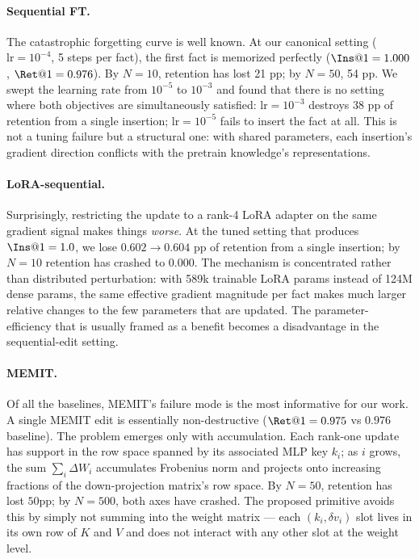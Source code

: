 \documentclass[11pt,a4paper]{article}
\begin{document}
\paragraph{Sequential FT.} The catastrophic forgetting curve is well
known. At our canonical setting ($\text{lr} = 10^{-4}$, 5 steps per
fact), the first fact is memorized perfectly ($\Ins@1 = 1.000$,
$\Ret@1 = 0.976$). By $N = 10$, retention has lost 21 pp; by $N = 50$,
54 pp. We swept the learning rate from $10^{-5}$ to $10^{-3}$ and found
that there is no setting where both objectives are simultaneously
satisfied: $\text{lr} = 10^{-3}$ destroys 38 pp of retention from a
single insertion; $\text{lr} = 10^{-5}$ fails to insert the fact at
all. This is not a tuning failure but a structural one: with shared
parameters, each insertion's gradient direction conflicts with the
pretrain knowledge's representations.

\paragraph{LoRA-sequential.} Surprisingly, restricting the update to a
rank-4 LoRA adapter on the same gradient signal makes things \emph{worse}.
At the tuned setting that produces $\Ins@1 = 1.0$, we lose
$0.602 \to 0.604$ pp of retention from a single insertion; by $N = 10$
retention has crashed to $0.000$. The mechanism is concentrated rather
than distributed perturbation: with 589k trainable LoRA params instead
of 124M dense params, the same effective gradient magnitude per fact
makes much larger relative changes to the few parameters that are
updated. The parameter-efficiency that is usually framed as a benefit
becomes a disadvantage in the sequential-edit setting.

\paragraph{MEMIT.} Of all the baselines, MEMIT's failure mode is the
most informative for our work. A single MEMIT edit is essentially
non-destructive ($\Ret@1 = 0.975$ vs $0.976$ baseline). The problem
emerges only with accumulation. Each rank-one update has support in the
row space spanned by its associated MLP key $k_i$; as $i$ grows, the
sum $\sum_i \Delta W_i$ accumulates Frobenius norm and projects onto
increasing fractions of the down-projection matrix's row space. By
$N = 50$, retention has lost $50$pp; by $N = 500$, both axes have
crashed. The proposed primitive avoids this by simply not summing into
the weight matrix --- each $(k_i, \delta v_i)$ slot lives in its own
row of $K$ and $V$ and does not interact with any other slot at the
weight level.
\end{document}
